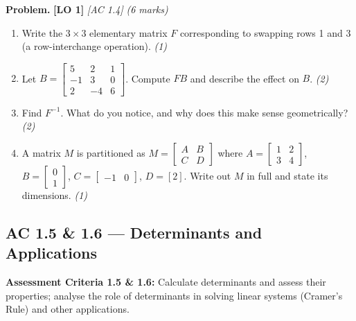 \documentclass[12pt,a4paper]{article}
\newcommand{\lo}[1]{\textcolor{locolor}{\textbf{[LO #1]}}}
\newcommand{\ac}[1]{\textcolor{locolor}{\textit{[AC #1]}}}
\newcommand{\mat}[1]{\begin{bmatrix}#1\end{bmatrix}}
\begin{document}
	\begin{tcolorbox}[practice]
		\textbf{Problem.} \lo{1} \ac{1.4} \hfill \textit{(6 marks)}
		
		\begin{enumerate}[label=(\alph*)]
			\item Write the $3\times3$ elementary matrix $F$ corresponding to swapping rows 1 and 3 (a row-interchange operation). \hfill\textit{(1)}
			\item Let $B = \mat{5&2&1\\-1&3&0\\2&-4&6}$.
			Compute $FB$ and describe the effect on $B$. \hfill\textit{(2)}
			\item Find $F^{-1}$. What do you notice, and why does this make sense geometrically? \hfill\textit{(2)}
			\item A matrix $M$ is partitioned as
			$M = \left[\begin{smallmatrix} A & B \\ C & D \end{smallmatrix}\right]$
			where $A = \mat{1&2\\3&4}$, $B = \mat{0\\1}$, $C = \mat{-1&0}$, $D = [2]$.
			Write out $M$ in full and state its dimensions. \hfill\textit{(1)}
		\end{enumerate}
	\end{tcolorbox}
	
	\begin{tcolorbox}[answer]
	\end{tcolorbox}
	
	\newpage
	
	\subsection{AC 1.5 \& 1.6 — Determinants and Applications}
	
	\begin{tcolorbox}[subtopic]
		\textbf{Assessment Criteria 1.5 \& 1.6:} Calculate determinants and assess their properties;
		analyse the role of determinants in solving linear systems (Cramer's Rule) and other applications.
	\end{tcolorbox}
	
\end{document}
